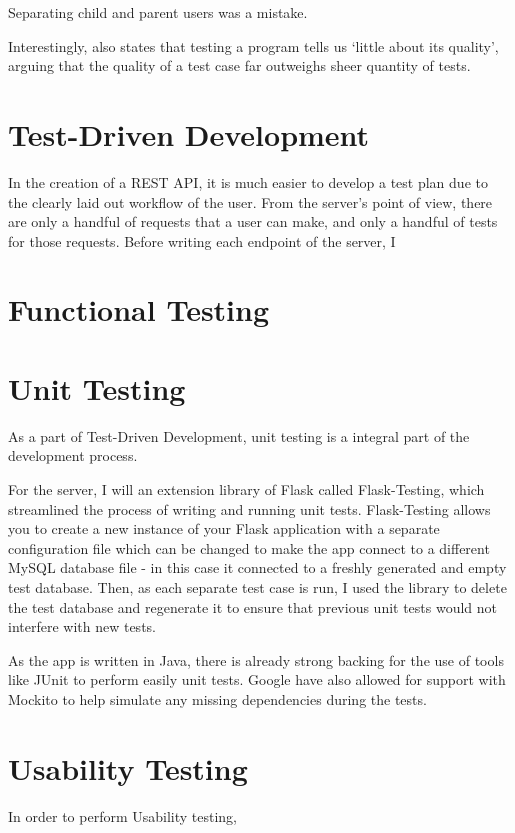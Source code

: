Separating child and parent users was a mistake.

Interestingly, \cite{4597151} also states that testing a program tells us `little about its quality', arguing that the quality of a test case far outweighs sheer quantity of tests.

\section{Test-Driven Development}
In the creation of a REST API, it is much easier to develop a test plan due to the clearly laid out workflow of the user. From the server's point of view, there are only a handful of requests that a user can make, and only a handful of tests for those requests. Before writing each endpoint of the server, I 

\section{Functional Testing}

\section{Unit Testing}

As a part of Test-Driven Development, unit testing is a integral part of the development process.


For the server, I will an extension library of Flask called Flask-Testing, which streamlined the process of writing and running unit tests.
Flask-Testing allows you to create a new instance of your Flask application with a separate configuration file which can be changed to make the app connect to a different MySQL database file - in this case it connected to a freshly generated and empty test database.
Then, as each separate test case is run, I used the library to delete the test database and regenerate it to ensure that previous unit tests would not interfere with new tests.




As the app is written in Java, there is already strong backing for the use of tools like JUnit to perform easily unit tests.
Google have also allowed for support with Mockito to help simulate any missing dependencies during the tests.


\section{Usability Testing}
In order to perform Usability testing, 

